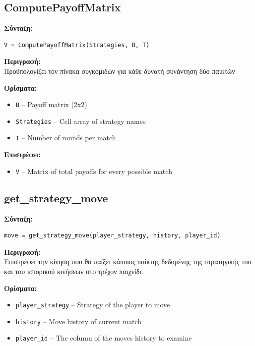 \documentclass[12pt]{report}
\begin{document}
\subsection*{ComputePayoffMatrix}

\textbf{\foreignlanguage{greek}{Σύνταξη}:}
\begin{verbatim}
V = ComputePayoffMatrix(Strategies, B, T)
\end{verbatim}

\textbf{\foreignlanguage{greek}{Περιγραφή:}} \\
\foreignlanguage{greek}{
Προϋπολογίζει τον πίνακα συγκομιδών για κάθε δυνατή συνάντηση δύο παικτών}

\textbf{\foreignlanguage{greek}{Ορίσματα:}}
\begin{itemize}
    \item \texttt{B} – Payoff matrix (2x2)
    \item \texttt{Strategies} – Cell array of strategy names
    \item \texttt{T} – Number of rounds per match
\end{itemize}

\textbf{\foreignlanguage{greek}{Επιστρέφει}:}
\begin{itemize}
    \item \texttt{V} – Matrix of total payoffs for every possible match
\end{itemize}

\subsection*{get\_strategy\_move}

\textbf{\foreignlanguage{greek}{Σύνταξη}:}
\begin{verbatim}
move = get_strategy_move(player_strategy, history, player_id)
\end{verbatim}

\textbf{\foreignlanguage{greek}{Περιγραφή:}} \\
\foreignlanguage{greek}{
Επιστρέφει την κίνηση που θα παίξει κάποιος παίκτης δεδομένης της στρατηγικής του και του ιστορικού κινήσεων στο τρέχον παιχνίδι.}

\textbf{\foreignlanguage{greek}{Ορίσματα:}}
\begin{itemize}
    \item \texttt{player\_strategy} – Strategy of the player to move
    \item \texttt{history} – Move history of current match
    \item \texttt{player\_id} – The column of the moves history to examine
\end{itemize}
\end{document}
